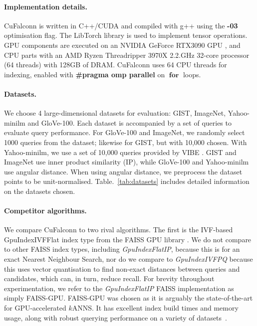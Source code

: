 \documentclass{article}
\newcommand{\cf}{CuFalconn\xspace}
\newcommand{\fgpu}{FAISS-GPU\xspace}
\newcommand{\glv}{GloVe-100\xspace}
\newcommand{\ymlm}{Yahoo-minilm\xspace}
\begin{document}
\paragraph{Implementation details.} 

\cf is written in C++/CUDA and compiled with g++ using the \textbf{-03} optimisation flag. The LibTorch library \cite{Ansel_PyTorch_2_Faster_2024} is used to implement tensor operations. GPU components are executed on an NVIDIA GeForce RTX3090 GPU \cite{nvidia_rtx_3090}, and CPU parts with an AMD Ryzen Threadripper 3970X 2.2.GHz 32-core processor (64 threads) with 128GB of DRAM. \cf uses 64 CPU threads for indexing, enabled with \textbf{\#pragma omp parallel} on $\operatorname{\textbf{for}}$ loops.

\paragraph{Datasets.} 

We choose 4 large-dimensional datasets for evaluation: GIST, ImageNet, Yahoo-minilm and GloVe-100. Each dataset is accompanied by a set of queries to evaluate query performance. For GloVe-100 and ImageNet, we randomly select 1000 queries from the dataset; likewise for GIST, but with 10,000 chosen. With Yahoo-minilm, we use a set of 10,000 queries provided by VIBE \cite{jaasaari2025vibe}. 
GIST and ImageNet use inner product similarity (IP), while \glv and \ymlm use angular distance. When using angular distance, we preprocess the dataset points to be unit-normalised. Table.~\ref{tab:datasets} includes detailed information on the datasets chosen.

\paragraph{Competitor algorithms.} 

We compare \cf to two rival algorithms. The first is the IVF-based GpuIndexIVFFlat index type from the FAISS GPU library \cite{douze2025faiss}. We do not compare to other FAISS index types, including \textit{GpuIndexFlatIP}, because this is for an exact Nearest Neighbour Search, nor do we compare to \textit{GpuIndexIVFPQ} because this uses vector quantisation to find non-exact distances between queries and candidates, which can, in turn, reduce recall. For brevity throughout experimentation, we refer to the \textit{GpuIndexFlatIP} FAISS implementation as simply \fgpu. \fgpu was chosen as it is arguably the state-of-the-art for GPU-accelerated $k$ANNS. It has excellent index build times and memory usage, along with robust querying performance on a variety of datasets~\cite{aumuller2020ann}. 
\end{document}
